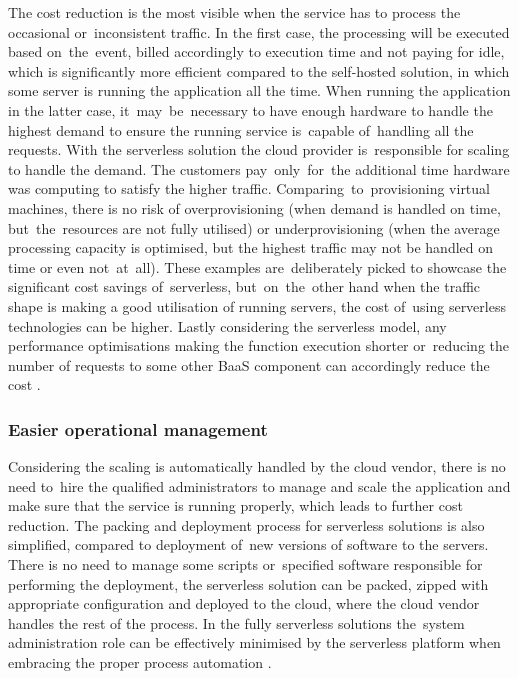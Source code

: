 The cost reduction is the most visible when the service has to process the occasional or~inconsistent traffic. In the first case, the processing will be executed based on~the~event, billed accordingly to execution time and not paying for idle, which is significantly more efficient compared to the self-hosted solution, in which some server is running the application all the time. When running the application in the latter case, it~may~be~necessary to have enough hardware to handle the highest demand to ensure the running service is~capable of~handling all the requests. With the serverless solution the cloud provider is~responsible for scaling to handle the demand. The customers pay~only~for~the additional time hardware was computing to satisfy the higher traffic. Comparing~to~provisioning virtual machines, there is no risk of overprovisioning (when demand is handled on time, but~the~resources are not fully utilised) or underprovisioning (when the average processing capacity is optimised, but the highest traffic may not be handled on time or even not~at~all). These examples are~deliberately picked to showcase the significant cost savings of~serverless, but~on~the~other hand when the traffic shape is making a good utilisation of running servers, the cost of~using serverless technologies can be higher. Lastly considering the serverless model, any performance optimisations making the function execution shorter or~reducing the number of requests to some other BaaS component can accordingly reduce the cost \cite{MartinFowlerServerless}.

\subsubsection{Easier operational management} \label{chapter:serverless-easier-operational-management}

Considering the scaling is automatically handled by the cloud vendor, there is no need to~hire the qualified administrators to manage and scale the application and make sure that the service is running properly, which leads to further cost reduction. The packing and deployment process for serverless solutions is also simplified, compared to deployment of~new versions of software to the servers. There is no need to manage some scripts or~specified software responsible for performing the deployment, the serverless solution can be packed, zipped with appropriate configuration and deployed to the cloud, where the cloud vendor handles the rest of the process. In the fully serverless solutions the~system administration role can be effectively minimised by the serverless platform when embracing the proper process automation \cite{MartinFowlerServerless}.

